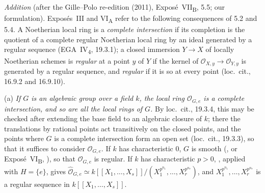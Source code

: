 
\medskip
\noindent\emph{Addition} (after the Gille--Polo re-edition (2011),
Expos\'e~VII\textsubscript{B}, 5.5; our formulation). Expos\'es~III and
VI\textsubscript{A} refer to the following consequences of 5.2 and 5.4. A
Noetherian local ring is a \emph{complete intersection} if its completion
is the quotient of a complete regular Noetherian local ring by an ideal
generated by a regular sequence (EGA~IV\textsubscript{4}, 19.3.1); a
closed immersion \(Y\to X\) of locally Noetherian schemes is
\emph{regular} at a point \(y\) of \(Y\) if the kernel of
\(\mathcal O_{X,y}\to\mathcal O_{Y,y}\) is generated by a regular
sequence, and \emph{regular} if it is so at every point
(loc.\ cit., 16.9.2 and 16.9.10).

\smallskip
\noindent{}
\label{sga3:VIIB:5.5.1}%
(a) \emph{If \(G\) is an algebraic group over a field \(k\), the local
ring \(\mathcal O_{G,e}\) is a complete intersection, and so are all the
local rings of \(G\).} By loc.\ cit., 19.3.4, this may be checked after
extending the base field to an algebraic closure of \(k\); there the
translations by rational points act transitively on the closed points,
and the points where \(G\) is a complete intersection form an open set
(loc.\ cit., 19.3.3), so that it suffices to consider \(\mathcal O_{G,e}\).
If \(k\) has characteristic \(0\), \(G\) is smooth
(, or Expos\'e~VI\textsubscript{B}, ), so that
\(\mathcal O_{G,e}\) is regular. If \(k\) has characteristic \(p>0\),
, applied with \(H=\{e\}\), gives
\(\widehat{\mathcal O}_{G,e}\simeq
k[[X_1,\ldots,X_s]]/(X_1^{p^{n_1}},\ldots,X_r^{p^{n_r}})\), and
\(X_1^{p^{n_1}},\ldots,X_r^{p^{n_r}}\) is a regular sequence in
\(k[[X_1,\ldots,X_s]]\).


